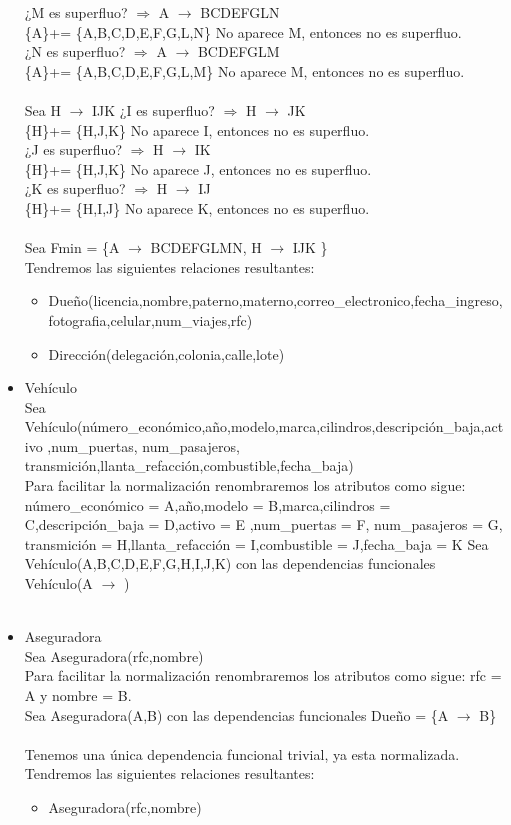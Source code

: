 \documentclass{article}
\begin{document}
\begin{itemize}
¿M es superfluo? $\Rightarrow$ A $\rightarrow$ BCDEFGLN \\
\{A\}+= \{A,B,C,D,E,F,G,L,N\}  No aparece M, entonces no es superfluo.\\
¿N es superfluo? $\Rightarrow$ A $\rightarrow$ BCDEFGLM \\
\{A\}+= \{A,B,C,D,E,F,G,L,M\}  No aparece M, entonces no es superfluo.\\
\\
Sea H $\rightarrow$ IJK 
¿I es superfluo? $\Rightarrow$ H $\rightarrow$ JK \\
\{H\}+= \{H,J,K\} No aparece I, entonces no es superfluo.\\
¿J es superfluo? $\Rightarrow$ H $\rightarrow$ IK \\
\{H\}+= \{H,J,K\} No aparece J, entonces no es superfluo.\\
¿K es superfluo? $\Rightarrow$ H $\rightarrow$ IJ \\
\{H\}+= \{H,I,J\} No aparece K, entonces no es superfluo.\\
\\
Sea Fmin = \{A $\rightarrow$ BCDEFGLMN, H $\rightarrow$ IJK  \}\\
Tendremos las siguientes relaciones resultantes:
\begin{itemize}
\item Dueño(licencia,nombre,paterno,materno,correo\_electronico,fecha\_ingreso,fotografia,celular,num\_viajes,rfc)
\item Dirección(delegación,colonia,calle,lote)
\end{itemize}


\item Vehículo\\
Sea Vehículo(número\_económico,año,modelo,marca,cilindros,descripción\_baja,activo
,num\_puertas, num\_pasajeros, transmición,llanta\_refacción,combustible,fecha\_baja)\\
Para facilitar la normalización renombraremos los atributos como sigue:
número\_económico = A,año,modelo = B,marca,cilindros = C,descripción\_baja = D,activo = E
,num\_puertas = F, num\_pasajeros = G, transmición = H,llanta\_refacción = I,combustible = J,fecha\_baja = K
Sea Vehículo(A,B,C,D,E,F,G,H,I,J,K) con las dependencias funcionales
Vehículo(A $\rightarrow$ ) \\
\\



\item Aseguradora\\
Sea Aseguradora(rfc,nombre)\\
Para facilitar la normalización renombraremos los atributos como sigue:
rfc = A y nombre = B.\\
Sea Aseguradora(A,B) con las dependencias funcionales 
Dueño = \{A $\rightarrow$ B\} \\
\\
Tenemos una única dependencia funcional trivial, ya esta normalizada.
Tendremos las siguientes relaciones resultantes:
\begin{itemize}
\item Aseguradora(rfc,nombre)\\
\end{itemize}



\end{itemize}
\end{document}
